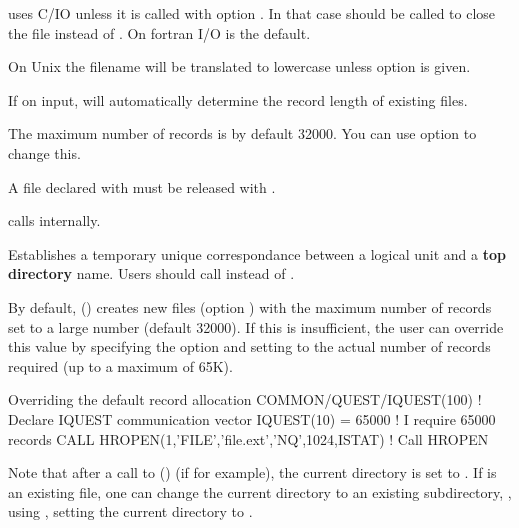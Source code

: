 \Remarks
\begin{UL}
\item {} uses C/IO unless it is called with option . In that
      case  should be called to close the file instead of 
      . On  fortran I/O is the default.
\item On Unix the filename  will be translated to lowercase unless
      option  is given.
\item If  on input,  will automatically determine the
      record length of existing files.
\item The maximum number of records is by default 32000.
      You can use option  to change this.
\item A file declared with  must be released with .
\item {} calls  internally.
\end{UL} 


 
\Action
Establishes a temporary unique correspondance
between a logical unit and a {\bf top directory} name.
Users should call  instead of .
 
By default,  () creates new files (option ) with 
the maximum number of records set to a large number (default 32000). 
If this is insufficient, the user can override this
value by specifying the  option and setting  to the
actual number of records required (up to a maximum of 65K).
\begin{XMPt}{Overriding the default record allocation}
      COMMON/QUEST/IQUEST(100)                         ! Declare IQUEST communication vector
      IQUEST(10) = 65000                               ! I require 65000 records
      CALL HROPEN(1,'FILE','file.ext','NQ',1024,ISTAT) ! Call HROPEN
\end{XMPt}

Note that after a call to  () 
(if  for example),
the current directory is set to .
If  is an existing file, one can change the current directory
to an existing subdirectory, , using
, setting
the current directory  to .
 
